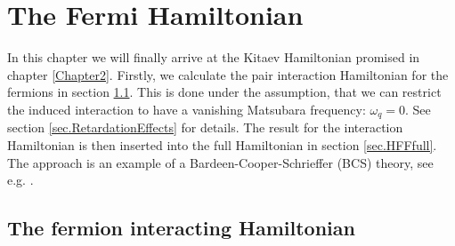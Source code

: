 
\chapter{The Fermi Hamiltonian} %

\label{Chapter4} %


In this chapter we will finally arrive at the Kitaev Hamiltonian promised in chapter \ref{Chapter2}. Firstly, we calculate the pair interaction Hamiltonian for the fermions in section \ref{sec.HFFint}. This is done under the assumption, that we can restrict the induced interaction to have a vanishing Matsubara frequency: $\omega_q = 0$. See section \ref{sec.RetardationEffects} for details. The result for the interaction Hamiltonian is then inserted into the full Hamiltonian in section \ref{sec.HFFfull}. The approach is an example of a Bardeen-Cooper-Schrieffer (BCS) theory, see e.g. \cite{Tinkham,LandauStatPhys2,PlischkeStatPhys}. 

\section{The fermion interacting Hamiltonian} \label{sec.HFFint}

